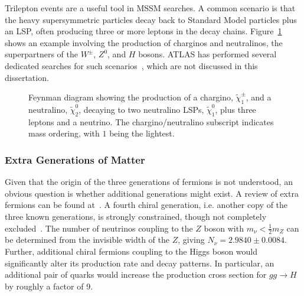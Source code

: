 Trilepton events are a useful tool in MSSM searches. A common scenario is that the heavy supersymmetric particles decay back to Standard Model particles plus an LSP, often producing three or more leptons in the decay chains. Figure~\ref{fig:theory-susy-trilepton-example} shows an example involving the production of charginos and neutralinos, the superpartners of the $W^{\pm}$, $Z^0$, and $H$ bosons. ATLAS has performed several dedicated searches for such scenarios~\cite{TheATLASCollaboration:2014cs,Aad:2014ia,TheATLASCollaboration:2014hq}, which are not discussed in this dissertation. 

\begin{figure}[htbp]
	\centering
	\caption{Feynman diagram showing the production of a chargino, $\tilde{\chi}_1^{\pm}$, and a neutralino, $\tilde{\chi}^0_2$, decaying to two neutralino LSPs, $\tilde{\chi}^0_1$, plus three leptons and a neutrino. The chargino/neutralino subscript indicates mass ordering, with $1$ being the lightest.}
	\label{fig:theory-susy-trilepton-example}
\end{figure}



\subsubsection{Extra Generations of Matter}\label{sec:theory-bsm-vlf}
Given that the origin of the three generations of fermions is not understood, an obvious question is whether additional generations might exist. A review of extra fermions can be found at~\cite{Frampton:1999kr}. A fourth chiral generation, i.e. another copy of the three known generations, is strongly constrained, though not completely excluded~\cite{Buchkremer:2012gb,Djouadi:2012dm,Chanowitz:2013hk,Banerjee:2014gy}. The number of neutrinos coupling to the $Z$ boson with $m_{\nu}<\frac12 m_Z$ can be determined from the invisible width of the $Z$, giving $N_{\nu}= 2.9840 \pm 0.0084$. Further, additional chiral fermions coupling to the Higgs boson would significantly alter its production rate and decay patterns. In particular, an additional pair of quarks would increase the production cross section for $gg\rightarrow H$ by roughly a factor of 9. 

